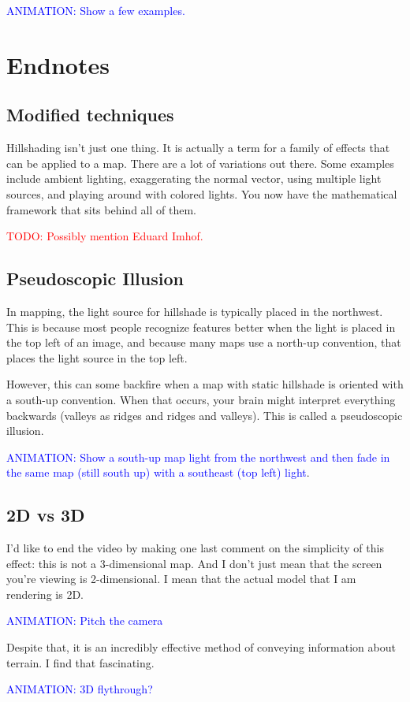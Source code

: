 \documentclass{article}
\newcommand\todo[1]{\textcolor{red}{TODO: #1}}
\newcommand\animation[1]{\textcolor{blue}{ANIMATION: #1}}
\begin{document}
\animation{Show a few examples.}

\section{Endnotes}

\subsection{Modified techniques}

Hillshading isn't just one thing.
It is actually a term for a family of effects that can be applied to a map.
There are a lot of variations out there.
Some examples include ambient lighting, exaggerating the normal vector, using multiple light sources, and playing around with colored lights.
You now have the mathematical framework that sits behind all of them.

\todo{Possibly mention Eduard Imhof.}

\subsection{Pseudoscopic Illusion}

In mapping, the light source for hillshade is typically placed in the northwest.
This is because most people recognize features better when the light is placed in the top left of an image, and because many maps use a north-up convention, that places the light source in the top left.

However, this can some backfire when a map with static hillshade is oriented with a south-up convention.
When that occurs, your brain might interpret everything backwards (valleys as ridges and ridges and valleys).
This is called a pseudoscopic illusion.

\animation{Show a south-up map light from the northwest and then fade in the same map (still south up) with a southeast (top left) light}.

\subsection{2D vs 3D}

I'd like to end the video by making one last comment on the simplicity of this effect: this is not a 3-dimensional map.
And I don't just mean that the screen you're viewing is 2-dimensional.
I mean that the actual model that I am rendering is 2D.

\animation{Pitch the camera}

Despite that, it is an incredibly effective method of conveying information about terrain.
I find that fascinating.

\animation{3D flythrough?}
\end{document}
